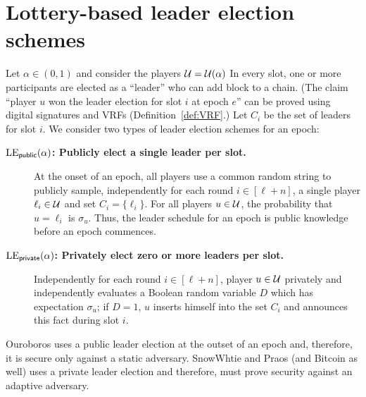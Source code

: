 \section{Lottery-based leader election schemes}\label{sec:leader-election-public-private}
Let $\alpha \in (0,1)$ and consider the players $\mathcal{U} = \mathcal{U}(\alpha)$
In every slot, 
one or more participants are elected as a ``leader'' who can add block to a chain. 
(The claim ``player $u$ won the leader election for slot $i$ at epoch $e$'' 
can be proved using digital signatures and VRFs (Definition~\ref{def:VRF}.)
Let $C_i$ be the set of leaders for slot $i$. 
We consider two types of leader election schemes for an epoch: 
\begin{description}
    \item[\textbf{$\mathrm{LE}_\mathsf{public}(\alpha)$: Publicly elect a single leader per slot.}] \label{lottery:public}
    At the onset of an epoch, 
    all players use a common random string to 
    publicly sample, 
    independently for each round $i \in [\ell + n]$, 
    a single player $\ell_i \in \mathcal{U}$ and  
    set $C_i = \{\ell_i\}$. 
    For all players $u \in \mathcal{U}$, 
    the probability that $u = \ell_i$ is $\sigma_u$. 
    Thus, the leader schedule for an epoch 
    is public knowledge before an epoch commences. 

    \item[\textbf{$\mathrm{LE}_\mathsf{private}(\alpha)$: Privately elect zero or more leaders per slot.}] \label{lottery:private}
    Independently for each round $i \in [\ell + n]$, 
    player $u \in \mathcal{U}$ 
    privately and independently 
    evaluates a Boolean random variable $D$
    which has expectation $\sigma_u$; 
    if $D = 1$, $u$ 
    inserts himself into the set $C_i$ 
    and announces this fact during slot $i$. 
\end{description}
\noindent
Ouroboros uses a public leader election 
at the outset of an epoch 
and, therefore, it is secure only against a static adversary. 
SnowWhtie and Praos (and Bitcoin as well) uses a private leader election 
and therefore, must prove security against an adaptive adversary. 


